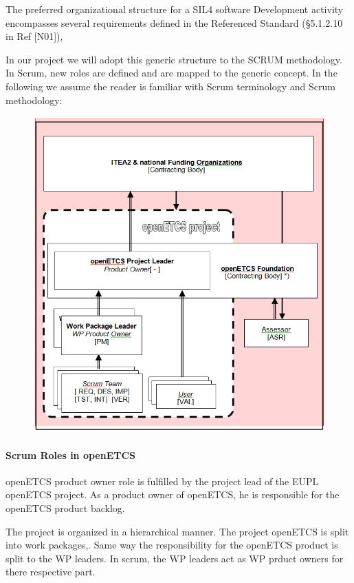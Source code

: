 \documentclass{template/openetcs_article}
\begin{document}
The preferred organizational structure for a SIL4 software Development activity encompasses several requirements defined in the Referenced Standard ({\S}5.1.2.10 in Ref [N01]),

In our project we will adopt this generic structure to the SCRUM methodology. In Scrum, new roles are defined and are mapped to the generic concept. In the following we assume the reader is familiar with Scrum terminology and Scrum methodology:



\begin{figure}
\includegraphics[width=\textwidth]{./figures/organization.png}
\end{figure}



\paragraph{Scrum Roles in openETCS}
openETCS product owner role is fulfilled by the project lead of the EUPL openETCS project. As a product owner of openETCS, he is responsible for the openETCS product backlog.

The project is organized in a hierarchical manner. The project openETCS is split into work packages,. Same way the responsibility for the openETCS product is split to the WP leaders. In scrum, the WP leaders act as WP prduct owners for there respective part.
\end{document}
